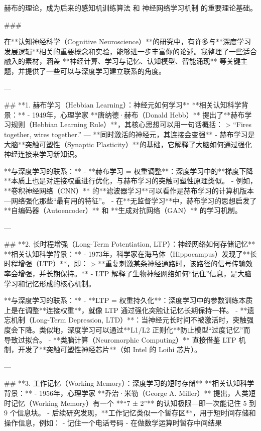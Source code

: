 赫布的理论，成为后来的感知机训练算法 和 神经网络学习机制 的重要理论基础。

###

在**认知神经科学（Cognitive Neuroscience）**的研究中，有许多与**深度学习发展逻辑**相关的重要概念和实验，能够进一步丰富你的论述。我整理了一些适合融入的素材，涵盖 **神经计算、学习与记忆、认知模型、智能涌现** 等关键主题，并提供了一些可以与深度学习建立联系的角度。

---

## **1. 赫布学习（Hebbian Learning）：神经元如何学习**
**相关认知科学背景：**
- 1949年，心理学家 **唐纳德·赫布（Donald Hebb）** 提出了**赫布学习规则（Hebbian Learning Rule）**，其核心思想可以用一句话概括：
  > “Fires together, wires together.” --- **同时激活的神经元，其连接会变强**
- 赫布学习是大脑**突触可塑性（Synaptic Plasticity）**的基础，它解释了大脑如何通过强化神经连接来学习新知识。

**与深度学习的联系：**
- **赫布学习 = 权重调整**：深度学习中的**梯度下降**本质上也是对连接权重进行优化，与赫布学习的突触可塑性原理类似。
- 例如，**卷积神经网络（CNN）** 的**滤波器学习**可以看作是赫布学习的计算机版本---网络强化那些“最有用的特征”。
- 在**无监督学习**中，赫布学习的思想启发了**自编码器（Autoencoder）** 和 **生成对抗网络（GAN）** 的学习机制。

---

## **2. 长时程增强（Long-Term Potentiation, LTP）：神经网络如何存储记忆**
**相关认知科学背景：**
- 1973年，科学家在海马体（Hippocampus）发现了**长时程增强（LTP）**，即：
  > **重复刺激某条神经通路时，该路径的信号传输效率会增强，并长期保持。**
- LTP 解释了生物神经网络如何“记住”信息，是大脑学习和记忆形成的核心机制。

**与深度学习的联系：**
- **LTP = 权重持久化**：深度学习中的参数训练本质上是在调整**连接权重**，就像 LTP 通过强化突触让记忆长期保持一样。
- **遗忘机制（Long-Term Depression, LTD）**：当神经元长时间不被激活时，突触强度会下降。类似地，深度学习可以通过**L1/L2 正则化**防止模型“过度记忆”而导致过拟合。
- **类脑计算（Neuromorphic Computing）** 直接借鉴 LTP 机制，开发了**突触可塑性神经芯片**（如 Intel 的 Loihi 芯片）。

---

## **3. 工作记忆（Working Memory）：深度学习的短时存储**
**相关认知科学背景：**
- 1956年，心理学家 **乔治·米勒（George A. Miller）** 提出，人类短时记忆（Working Memory）有一个 **“7 ± 2”** 的认知极限---即一次能记住 5 到 9 个信息块。
- 后续研究发现，**工作记忆类似一个暂存区**，用于短时间存储和操作信息，例如：
  - 记住一个电话号码
  - 在做数学运算时暂存中间结果


